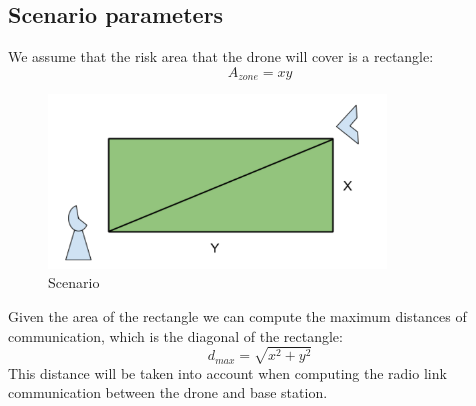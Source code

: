 \subsection*{Scenario parameters}
We assume that the risk area that the drone will cover is a rectangle:
\begin{equation*}\label{eq:scenario_parameters1} 
 		A_{zone} = xy
\end{equation*}
\begin{figure}[hb]
  	\centering
 	\includegraphics[width=0.8\textwidth]{figures/pic1.png}
  	\caption[Pipeline survey]{Scenario}
\end{figure}
Given the area of the rectangle we can compute the maximum distances of communication, which is the diagonal of the rectangle: 
\begin{equation*}\label{eq:scenario_parameters2} 
 		d_{max} = \sqrt{x^2 + y^2}
\end{equation*}
This distance will be taken into account when computing the radio link communication between the drone and base station.